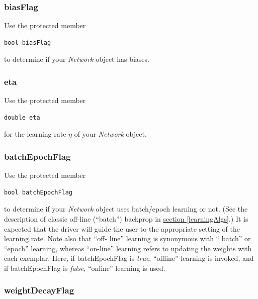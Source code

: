 \documentclass{report}
\begin{document}
\subsubsection{biasFlag}

Use the protected member

\begin{verbatim}
bool biasFlag
\end{verbatim}

to determine if your {\em Network} object has biases.

\subsubsection{eta}

Use the protected member

\begin{verbatim}
double eta
\end{verbatim}

for the learning rate $\eta$ of your {\em Network} object.

\subsubsection{batchEpochFlag}

Use the protected member

\begin{verbatim}
bool batchEpochFlag
\end{verbatim}

to determine if your {\em Network} object uses batch/epoch learning or
not.  (See the description of classic off-line (``batch'') backprop
in \hyperref[learningAlgs]{section \ref{learningAlgs}}.)
  It is expected that the driver will guide the
user to the appropriate setting of the learning rate.  Note also that
``off- line'' learning is synonymous with `` batch'' or ``epoch''
learning, whereas ``on-line'' learning refers to updating the weights
with each exemplar.  Here, if
batchEpochFlag is {\em true}, ``offline'' learning is invoked, and if
batchEpochFlag is {\em false}, ``online'' learning is used.

\label{discussDecay}
\subsubsection{weightDecayFlag}\label{decayFlagSection}
\end{document}
